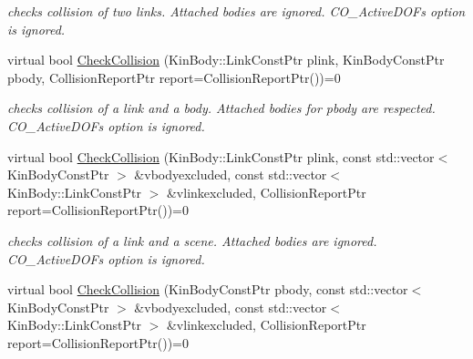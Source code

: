 \begin{DoxyCompactItemize}
\begin{DoxyCompactList}\small\item\em checks collision of two links. Attached bodies are ignored. CO\_\-ActiveDOFs option is ignored. \item\end{DoxyCompactList}\item 
\hypertarget{classOpenRAVE_1_1CollisionCheckerBase_ab14f3598db6c781c3f2f6ef188fdeb3f}{
virtual bool \hyperlink{classOpenRAVE_1_1CollisionCheckerBase_ab14f3598db6c781c3f2f6ef188fdeb3f}{CheckCollision} (KinBody::LinkConstPtr plink, KinBodyConstPtr pbody, CollisionReportPtr report=CollisionReportPtr())=0}
\label{classOpenRAVE_1_1CollisionCheckerBase_ab14f3598db6c781c3f2f6ef188fdeb3f}

\begin{DoxyCompactList}\small\item\em checks collision of a link and a body. Attached bodies for pbody are respected. CO\_\-ActiveDOFs option is ignored. \item\end{DoxyCompactList}\item 
\hypertarget{classOpenRAVE_1_1CollisionCheckerBase_a8c2bdc1a68281fb48214f3c141dc26a9}{
virtual bool \hyperlink{classOpenRAVE_1_1CollisionCheckerBase_a8c2bdc1a68281fb48214f3c141dc26a9}{CheckCollision} (KinBody::LinkConstPtr plink, const std::vector$<$ KinBodyConstPtr $>$ \&vbodyexcluded, const std::vector$<$ KinBody::LinkConstPtr $>$ \&vlinkexcluded, CollisionReportPtr report=CollisionReportPtr())=0}
\label{classOpenRAVE_1_1CollisionCheckerBase_a8c2bdc1a68281fb48214f3c141dc26a9}

\begin{DoxyCompactList}\small\item\em checks collision of a link and a scene. Attached bodies are ignored. CO\_\-ActiveDOFs option is ignored. \item\end{DoxyCompactList}\item 
\hypertarget{classOpenRAVE_1_1CollisionCheckerBase_a013763101e3cb1fcad594c030e5472fe}{
virtual bool \hyperlink{classOpenRAVE_1_1CollisionCheckerBase_a013763101e3cb1fcad594c030e5472fe}{CheckCollision} (KinBodyConstPtr pbody, const std::vector$<$ KinBodyConstPtr $>$ \&vbodyexcluded, const std::vector$<$ KinBody::LinkConstPtr $>$ \&vlinkexcluded, CollisionReportPtr report=CollisionReportPtr())=0}
\label{classOpenRAVE_1_1CollisionCheckerBase_a013763101e3cb1fcad594c030e5472fe}


\end{DoxyCompactItemize}
